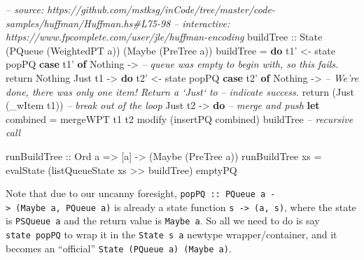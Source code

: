 \documentclass[]{article}
\newenvironment{Shaded}{\begin{snugshade}}{\end{snugshade}}
\newcommand{\CommentTok}[1]{\textcolor[rgb]{0.56,0.35,0.01}{\textit{#1}}}
\newcommand{\DataTypeTok}[1]{\textcolor[rgb]{0.13,0.29,0.53}{#1}}
\newcommand{\FunctionTok}[1]{\textcolor[rgb]{0.00,0.00,0.00}{#1}}
\newcommand{\KeywordTok}[1]{\textcolor[rgb]{0.13,0.29,0.53}{\textbf{#1}}}
\newcommand{\NormalTok}[1]{#1}
\newcommand{\OtherTok}[1]{\textcolor[rgb]{0.56,0.35,0.01}{#1}}
\begin{document}
\begin{Shaded}
\begin{Highlighting}[]
\CommentTok{-- source: https://github.com/mstksg/inCode/tree/master/code-samples/huffman/Huffman.hs#L75-98}
\CommentTok{-- interactive: https://www.fpcomplete.com/user/jle/huffman-encoding}
\OtherTok{buildTree ::} \DataTypeTok{State}\NormalTok{ (}\DataTypeTok{PQueue}\NormalTok{ (}\DataTypeTok{WeightedPT}\NormalTok{ a)) (}\DataTypeTok{Maybe}\NormalTok{ (}\DataTypeTok{PreTree}\NormalTok{ a))}
\NormalTok{buildTree }\FunctionTok{=} \KeywordTok{do}
\NormalTok{    t1' }\OtherTok{<-}\NormalTok{ state popPQ}
    \KeywordTok{case}\NormalTok{ t1' }\KeywordTok{of}
      \DataTypeTok{Nothing} \OtherTok{->}
        \CommentTok{-- queue was empty to begin with, so this fails.}
\NormalTok{        return }\DataTypeTok{Nothing}
      \DataTypeTok{Just}\NormalTok{ t1 }\OtherTok{->} \KeywordTok{do}
\NormalTok{        t2' }\OtherTok{<-}\NormalTok{ state popPQ}
        \KeywordTok{case}\NormalTok{ t2' }\KeywordTok{of}
          \DataTypeTok{Nothing}  \OtherTok{->}
            \CommentTok{-- We're done, there was only one item!  Return a `Just` to}
            \CommentTok{-- indicate success.}
\NormalTok{            return (}\DataTypeTok{Just}\NormalTok{ (_wItem t1))     }\CommentTok{-- break out of the loop}
          \DataTypeTok{Just}\NormalTok{ t2 }\OtherTok{->} \KeywordTok{do}
            \CommentTok{-- merge and push}
            \KeywordTok{let}\NormalTok{ combined }\FunctionTok{=}\NormalTok{ mergeWPT t1 t2}
\NormalTok{            modify (insertPQ combined)}
\NormalTok{            buildTree                     }\CommentTok{-- recursive call}

\OtherTok{runBuildTree ::} \DataTypeTok{Ord}\NormalTok{ a }\OtherTok{=>}\NormalTok{ [a] }\OtherTok{->}\NormalTok{ (}\DataTypeTok{Maybe}\NormalTok{ (}\DataTypeTok{PreTree}\NormalTok{ a))}
\NormalTok{runBuildTree xs }\FunctionTok{=}\NormalTok{ evalState (listQueueState xs }\FunctionTok{>>}\NormalTok{ buildTree) emptyPQ}
\end{Highlighting}
\end{Shaded}

Note that due to our uncanny foresight,
\texttt{popPQ\ ::\ PQueue\ a\ -\textgreater{}\ (Maybe\ a,\ PQueue\ a)} is
already a state function \texttt{s\ -\textgreater{}\ (a,\ s)}, where the state
is \texttt{PSQueue\ a} and the return value is \texttt{Maybe\ a}. So all we need
to do is say \texttt{state\ popPQ} to wrap it in the \texttt{State\ s\ a}
newtype wrapper/container, and it becomes an ``official''
\texttt{State\ (PQueue\ a)\ (Maybe\ a)}.
\end{document}
